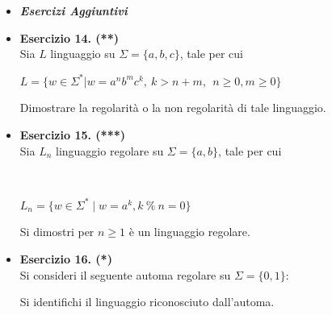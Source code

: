 \documentclass[a4paper,10pt]{article}
\begin{document}
{\begin{itemize}[label=, leftmargin=0pt]
    $$\\$$
    
    \item \textit{\textbf{Esercizi Aggiuntivi}}

    \item \textbf{Esercizio 14. (**)}\\ Sia $L$ linguaggio su $\Sigma=\{a,b,c\}$, tale per cui 
    {\begin{center}
        $L = \{ w\in \Sigma^* | w=a^nb^mc^k, \ k>n+m, \ \ n\geq 0, m\geq 0\}$
    \end{center}} 
    Dimostrare la regolarità o la non regolarità di tale linguaggio.\\[0.1cm]

    \item \textbf{Esercizio 15. (***)}\\ Sia $L_n$ linguaggio regolare su $\Sigma=\{a,b\}$, tale per cui 
    {\\ \begin{center}
        $L_n = \{ w \in \Sigma^* \mid w = a^k, k\ \%\ n=0\}$
    \end{center}} 
    Si dimostri per $n\geq 1$ è un linguaggio regolare.\\[0.1cm]

    \item \textbf{Esercizio 16. (*)}\\
    Si consideri il seguente automa regolare su $\Sigma = \{0,1\}$:
    {
    \small
    \begin{center}
    \end{center}
    }
    Si identifichi il linguaggio riconosciuto dall'automa.\\[0.1cm]



\end{itemize}}
\end{document}
